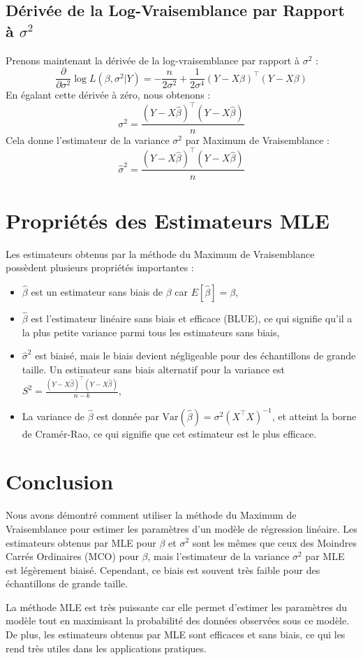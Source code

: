 \documentclass[14pt]{extarticle} %
\begin{document}
\subsection{Dérivée de la Log-Vraisemblance par Rapport à \(\sigma^2\)}
Prenons maintenant la dérivée de la log-vraisemblance par rapport à \(\sigma^2\) :
\[
\frac{\partial}{\partial \sigma^2} \log L(\beta, \sigma^2 | Y) = - \frac{n}{2\sigma^2} + \frac{1}{2\sigma^4} (Y - X\beta)^\top (Y - X\beta)
\]
En égalant cette dérivée à zéro, nous obtenons :
\[
\sigma^2 = \frac{(Y - X\hat{\beta})^\top (Y - X\hat{\beta})}{n}
\]
Cela donne l'estimateur de la variance \(\sigma^2\) par Maximum de Vraisemblance :
\[
\hat{\sigma}^2 = \frac{(Y - X\hat{\beta})^\top (Y - X\hat{\beta})}{n}
\]

\section{Propriétés des Estimateurs MLE}
Les estimateurs obtenus par la méthode du Maximum de Vraisemblance possèdent plusieurs propriétés importantes :
\begin{itemize}
    \item \(\hat{\beta}\) est un estimateur sans biais de \(\beta\) car \(E[\hat{\beta}] = \beta\),
    \item \(\hat{\beta}\) est l'estimateur linéaire sans biais et efficace (BLUE), ce qui signifie qu'il a la plus petite variance parmi tous les estimateurs sans biais,
    \item \(\hat{\sigma}^2\) est biaisé, mais le biais devient négligeable pour des échantillons de grande taille. Un estimateur sans biais alternatif pour la variance est \(S^2 = \frac{(Y - X\hat{\beta})^\top (Y - X\hat{\beta})}{n - k}\),
    \item La variance de \(\hat{\beta}\) est donnée par \( \text{Var}(\hat{\beta}) = \sigma^2 (X^\top X)^{-1} \), et atteint la borne de Cramér-Rao, ce qui signifie que cet estimateur est le plus efficace.
\end{itemize}

\section{Conclusion}
Nous avons démontré comment utiliser la méthode du Maximum de Vraisemblance pour estimer les paramètres d'un modèle de régression linéaire. Les estimateurs obtenus par MLE pour \(\beta\) et \(\sigma^2\) sont les mêmes que ceux des Moindres Carrés Ordinaires (MCO) pour \(\beta\), mais l'estimateur de la variance \(\sigma^2\) par MLE est légèrement biaisé. Cependant, ce biais est souvent très faible pour des échantillons de grande taille.

La méthode MLE est très puissante car elle permet d'estimer les paramètres du modèle tout en maximisant la probabilité des données observées sous ce modèle. De plus, les estimateurs obtenus par MLE sont efficaces et sans biais, ce qui les rend très utiles dans les applications pratiques.
\end{document}

